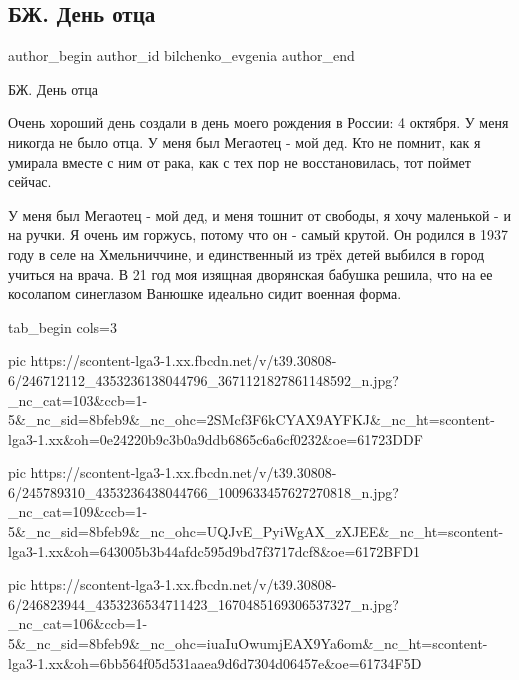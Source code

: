  
 
 
 
 
 
\subsection{БЖ. День отца}
\label{sec:18_10_2021.fb.bilchenko_evgenia.3.den_otca}
 
\ifcmt
 author_begin
   author_id bilchenko_evgenia
 author_end
\fi

БЖ. День отца

Очень хороший день создали в день моего рождения в России: 4 октября. У меня
никогда не было отца. У меня был Мегаотец - мой дед. Кто не помнит, как я
умирала вместе с ним от рака, как с тех пор не восстановилась, тот поймет
сейчас.

У меня был Мегаотец - мой дед, и меня тошнит от свободы, я хочу маленькой - и
на ручки. Я очень им горжусь, потому что он - самый крутой. Он родился в 1937
году в селе на Хмельниччине, и единственный из трёх детей выбился в город
учиться на врача. В 21 год моя изящная дворянская бабушка решила, что на ее
косолапом синеглазом Ванюшке идеально сидит военная форма. 

\ifcmt
  tab_begin cols=3

     pic https://scontent-lga3-1.xx.fbcdn.net/v/t39.30808-6/246712112_4353236138044796_3671121827861148592_n.jpg?_nc_cat=103&ccb=1-5&_nc_sid=8bfeb9&_nc_ohc=2SMcf3F6kCYAX9AYFKJ&_nc_ht=scontent-lga3-1.xx&oh=0e24220b9c3b0a9ddb6865c6a6cf0232&oe=61723DDF

     pic https://scontent-lga3-1.xx.fbcdn.net/v/t39.30808-6/245789310_4353236438044766_1009633457627270818_n.jpg?_nc_cat=109&ccb=1-5&_nc_sid=8bfeb9&_nc_ohc=UQJvE_PyiWgAX_zXJEE&_nc_ht=scontent-lga3-1.xx&oh=643005b3b44afdc595d9bd7f3717dcf8&oe=6172BFD1

     pic https://scontent-lga3-1.xx.fbcdn.net/v/t39.30808-6/246823944_4353236534711423_1670485169306537327_n.jpg?_nc_cat=106&ccb=1-5&_nc_sid=8bfeb9&_nc_ohc=iuaIuOwumjEAX9Ya6om&_nc_ht=scontent-lga3-1.xx&oh=6bb564f05d531aaea9d6d7304d06457e&oe=61734F5D

